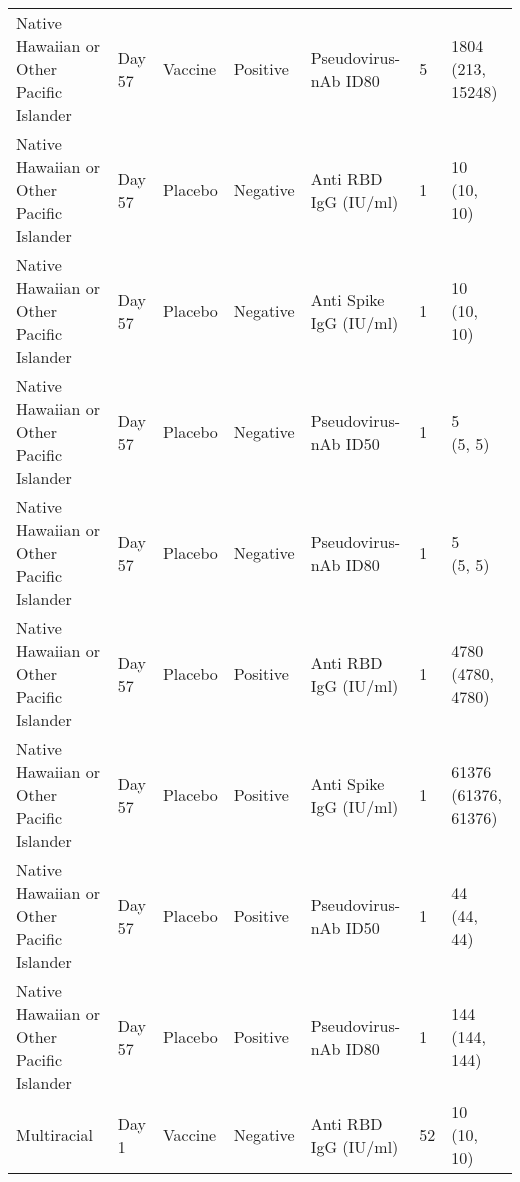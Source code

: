 \documentclass[]{book}
\theoremstyle{definition}
\theoremstyle{definition}
\theoremstyle{definition}
\newcommand{\1}{\mathbbm{1}}
\begin{document}
\begin{landscape}
\begin{ThreePartTable}
\begin{longtable}[t]{>{\raggedright\arraybackslash}p{7cm}llllll}
\hspace{1em}Native Hawaiian or Other Pacific Islander & Day 57 & Vaccine & Positive & Pseudovirus-nAb ID80 & 5 & \makecell[l]{1804\\(213, 15248)}\\
\hspace{1em}Native Hawaiian or Other Pacific Islander & Day 57 & Placebo & Negative & Anti RBD IgG (IU/ml) & 1 & \makecell[l]{10\\(10, 10)}\\
\hspace{1em}Native Hawaiian or Other Pacific Islander & Day 57 & Placebo & Negative & Anti Spike IgG (IU/ml) & 1 & \makecell[l]{10\\(10, 10)}\\
\hspace{1em}Native Hawaiian or Other Pacific Islander & Day 57 & Placebo & Negative & Pseudovirus-nAb ID50 & 1 & \makecell[l]{5\\(5, 5)}\\
\hspace{1em}Native Hawaiian or Other Pacific Islander & Day 57 & Placebo & Negative & Pseudovirus-nAb ID80 & 1 & \makecell[l]{5\\(5, 5)}\\
\hspace{1em}Native Hawaiian or Other Pacific Islander & Day 57 & Placebo & Positive & Anti RBD IgG (IU/ml) & 1 & \makecell[l]{4780\\(4780, 4780)}\\
\hspace{1em}Native Hawaiian or Other Pacific Islander & Day 57 & Placebo & Positive & Anti Spike IgG (IU/ml) & 1 & \makecell[l]{61376\\(61376, 61376)}\\
\hspace{1em}Native Hawaiian or Other Pacific Islander & Day 57 & Placebo & Positive & Pseudovirus-nAb ID50 & 1 & \makecell[l]{44\\(44, 44)}\\
\hspace{1em}Native Hawaiian or Other Pacific Islander & Day 57 & Placebo & Positive & Pseudovirus-nAb ID80 & 1 & \makecell[l]{144\\(144, 144)}\\
\hspace{1em}Multiracial & Day 1 & Vaccine & Negative & Anti RBD IgG (IU/ml) & 52 & \makecell[l]{10\\(10, 10)}\\

\end{longtable}
\end{ThreePartTable}
\end{landscape}
\end{document}
